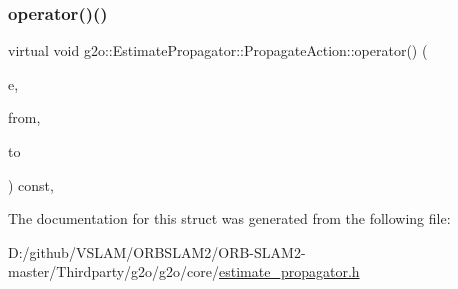 \subsubsection{\texorpdfstring{operator()()}{operator()()}}
{\footnotesize\ttfamily virtual void g2o\+::\+Estimate\+Propagator\+::\+Propagate\+Action\+::operator() (\begin{DoxyParamCaption}\item[{\mbox{\hyperlink{classg2o_1_1_optimizable_graph_1_1_edge}{Optimizable\+Graph\+::\+Edge}} $\ast$}]{e,  }\item[{const \mbox{\hyperlink{classg2o_1_1_hyper_graph_a703938cdb4bb636860eed55a2489d70c}{Optimizable\+Graph\+::\+Vertex\+Set}} \&}]{from,  }\item[{\mbox{\hyperlink{classg2o_1_1_optimizable_graph_1_1_vertex}{Optimizable\+Graph\+::\+Vertex}} $\ast$}]{to }\end{DoxyParamCaption}) const\hspace{0.3cm}{\ttfamily [inline]}, {\ttfamily [virtual]}}



The documentation for this struct was generated from the following file\+:\begin{DoxyCompactItemize}
\item 
D\+:/github/\+V\+S\+L\+A\+M/\+O\+R\+B\+S\+L\+A\+M2/\+O\+R\+B-\/\+S\+L\+A\+M2-\/master/\+Thirdparty/g2o/g2o/core/\mbox{\hyperlink{estimate__propagator_8h}{estimate\+\_\+propagator.\+h}}\end{DoxyCompactItemize}
